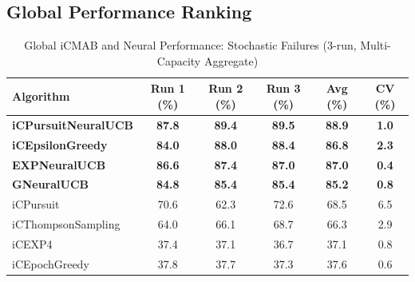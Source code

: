\documentclass[12pt,a4paper]{article}
\newcommand{\primarytext}[1]{\textcolor{primaryblue}{\textbf{#1}}}
\newcommand{\legacy}[1]{\textcolor{legacycolor}{\textbf{#1}}}
\newcommand{\neural}[1]{\textcolor{neuralcolor}{\textbf{#1}}}
\begin{document}
\begin{tcolorbox}[colback=tableheader,colframe=primaryblue,title=\textbf{Primary iCMAB Performance Results (Stochastic Environment, Attack Rate: 0.25)}]

\subsection{Global Performance Ranking}

\begin{table}[H]
\footnotesize
\centering
\caption{Global iCMAB and Neural Performance: Stochastic Failures (3-run, Multi-Capacity Aggregate)}
\label{tab:global-performance-stochastic}
\begin{tabular}{@{}lccccc@{}}
\toprule
\textbf{Algorithm} & \textbf{Run 1 (\%)} & \textbf{Run 2 (\%)} & \textbf{Run 3 (\%)} & \textbf{Avg (\%)} & \textbf{CV (\%)} \\
\midrule
\neural{iCPursuitNeuralUCB}   & \neural{87.8} & \neural{89.4} & \neural{89.5} & \neural{88.9} & \neural{1.0} \\
\primarytext{iCEpsilonGreedy}   & \primarytext{84.0} & \primarytext{88.0} & \primarytext{88.4} & \primarytext{86.8} & \primarytext{2.3} \\
\legacy{EXPNeuralUCB}           & \legacy{86.6} & \legacy{87.4} & \legacy{87.0} & \legacy{87.0} & \legacy{0.4} \\
\neural{GNeuralUCB}            & \neural{84.8} & \neural{85.4} & \neural{85.4} & \neural{85.2} & \neural{0.8} \\
iCPursuit                       & 70.6 & 62.3 & 72.6 & 68.5 & 6.5 \\
iCThompsonSampling              & 64.0 & 66.1 & 68.7 & 66.3 & 2.9 \\
iCEXP4                          & 37.4 & 37.1 & 36.7 & 37.1 & 0.8 \\
iCEpochGreedy                   & 37.8 & 37.7 & 37.3 & 37.6 & 0.6 \\
\bottomrule
\end{tabular}
\end{table}


\end{tcolorbox}
\end{document}
